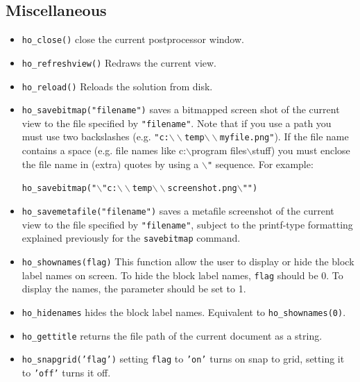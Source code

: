 \subsection{Miscellaneous}

\begin{itemize}

\item \texttt{ho\_close()} close the current postprocessor window.

\item{\tt ho\_refreshview()} Redraws the current view.

\item{\tt ho\_reload()} Reloads the solution from disk.

\item \texttt{ho\_savebitmap("filename")} saves a bitmapped screen shot of the current
view to the file specified by \texttt{"filename"}. Note that if you
use a path you must use two backslashes (e.g.
\texttt{"c:$\backslash \backslash $temp$\backslash \backslash
$myfile.png"}). If the file name contains a space (e.g. file
names like c:$\backslash $program files$\backslash $stuff) you must
enclose the file name in (extra) quotes by using a
\texttt{$\backslash $"} sequence. For example:

\texttt{ho\_savebitmap("$\backslash $"c:$\backslash \backslash
$temp$\backslash \backslash $screenshot.png$\backslash $"")}

\item \texttt{ho\_savemetafile("filename")} saves a metafile screenshot of the current
view to the file specified by \texttt{"filename"}, subject to the
printf-type formatting explained previously for the
\texttt{savebitmap} command.

\item \texttt{ho\_shownames(flag)} This function allow the user to display or hide the
block label names on screen. To hide the block label names,
\texttt{flag} should be 0. To display the names, the parameter
should be set to 1.


\item{\tt ho\_hidenames} hides the block label names. Equivalent to {\tt ho\_shownames(0)}.

\item{\tt ho\_gettitle} returns the file path of the current document as a string.

\item{\tt ho\_snapgrid('flag')} setting {\tt flag} to {\tt 'on'} turns on snap to grid, setting it to {\tt 'off'} turns it off.


\end{itemize}
